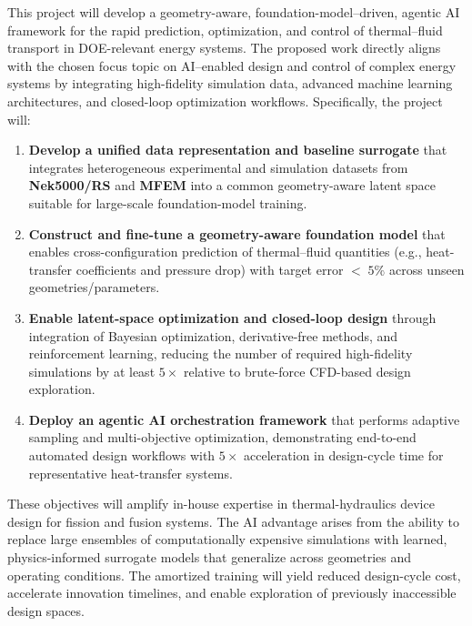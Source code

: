 This project will develop a geometry-aware, foundation-model–driven,
agentic AI framework for the rapid prediction, optimization, and control of
thermal–fluid transport in DOE-relevant energy systems. The proposed work
directly aligns with the chosen focus topic on AI–enabled
design and control of complex energy systems by integrating high-fidelity
simulation data, advanced machine learning architectures, and closed-loop
optimization workflows.
%
Specifically, the project will: \\[-3ex]
\begin{enumerate}
\item \textbf{Develop a unified data representation and baseline surrogate}
that integrates heterogeneous experimental and simulation datasets from
\textbf{Nek5000/RS} and \textbf{MFEM} into a common geometry-aware latent
space suitable for large-scale foundation-model training.
\\[-3ex]

\item \textbf{Construct and fine-tune a geometry-aware foundation model}
that enables cross-configuration prediction of thermal–fluid quantities
(e.g., heat-transfer coefficients and pressure drop) with target error
$< \; 5\%$ across unseen geometries/parameters.
\\[-3ex]

\item \textbf{Enable latent-space optimization and closed-loop design}
through integration of Bayesian optimization, derivative-free methods,
and reinforcement learning, reducing the number of required high-fidelity
simulations by at least $5\times$ relative to brute-force CFD-based
design exploration.
\\[-3ex]

\item \textbf{Deploy an agentic AI orchestration framework} that performs
adaptive sampling and multi-objective optimization, demonstrating
end-to-end automated design workflows with $5\times$ acceleration
in design-cycle time for representative heat-transfer systems.
\\[-3ex]
\end{enumerate}
   These objectives will amplify in-house expertise in thermal-hydraulics
device design for fission and fusion systems.
   The AI advantage arises from the ability to replace large ensembles of
computationally expensive simulations with learned, physics-informed surrogate
models that generalize across geometries and operating conditions. 
  The amortized training will yield reduced design-cycle cost, accelerate innovation
timelines, and enable exploration of previously inaccessible design spaces.

